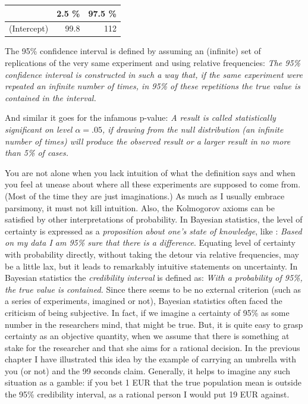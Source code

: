 \documentclass[]{svmono}
\newenvironment{Shaded}{\begin{snugshade}}{\end{snugshade}}
\newcommand{\KeywordTok}[1]{\textcolor[rgb]{0.13,0.29,0.53}{\textbf{#1}}}
\newcommand{\DataTypeTok}[1]{\textcolor[rgb]{0.13,0.29,0.53}{#1}}
\newcommand{\DecValTok}[1]{\textcolor[rgb]{0.00,0.00,0.81}{#1}}
\newcommand{\StringTok}[1]{\textcolor[rgb]{0.31,0.60,0.02}{#1}}
\newcommand{\OperatorTok}[1]{\textcolor[rgb]{0.81,0.36,0.00}{\textbf{#1}}}
\newcommand{\NormalTok}[1]{#1}
\begin{document}
\begin{Shaded}
\end{Shaded}

\begin{tabular}{l|r|r}
\hline
  & 2.5 \% & 97.5 \%\\
\hline
(Intercept) & 99.8 & 112\\
\hline
\end{tabular}

The 95\% confidence interval is defined by assuming an (infinite) set of
replications of the very same experiment and using relative frequencies:
\emph{The 95\% confidence interval is constructed in such a way that, if
the same experiment were repeated an infinite number of times, in 95\%
of these repetitions the true value is contained in the interval.}

And similar it goes for the infamous p-value: \emph{A result is called
statistically significant on level \(\alpha = .05\), if drawing from the
null distribution (an infinite number of times) will produce the
observed result or a larger result in no more than 5\% of cases.}

You are not alone when you lack intuition of what the definition says
and when you feel at unease about where all these experiments are
supposed to come from. (Most of the time they are just imaginations.) As
much as I usually embrace parsimony, it must not kill intuition. Also,
the Kolmogorov axioms can be satisfied by other interpretations of
probability. In Bayesian statistics, the level of certainty is expressed
as a \emph{proposition about one's state of knowledge}, like :
\emph{Based on my data I am 95\% sure that there is a difference}.
Equating level of certainty with probability directly, without taking
the detour via relative frequencies, may be a little lax, but it leads
to remarkably intuitive statements on uncertainty. In Bayesian
statistics the \emph{credibility interval} is defined as: \emph{With a
probability of 95\%, the true value is contained.} Since there seems to
be no external criterion (such as a series of experiments, imagined or
not), Bayesian statistics often faced the criticism of being subjective.
In fact, if we imagine a certainty of 95\% as some number in the
researchers mind, that might be true. But, it is quite easy to grasp
certainty as an objective quantity, when we assume that there is
something at stake for the researcher and that she aims for a rational
decision. In the previous chapter I have illustrated this idea by the
example of carrying an umbrella with you (or not) and the 99 seconds
claim. Generally, it helps to imagine any such situation as a gamble: if
you bet 1 EUR that the true population mean is outside the 95\%
credibility interval, as a rational person I would put 19 EUR against.
\end{document}
